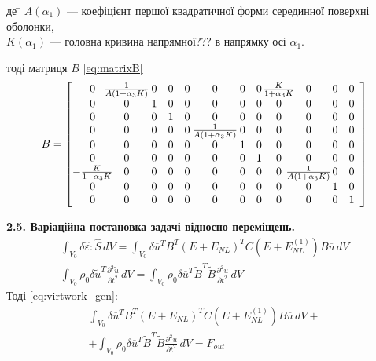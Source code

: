 \documentclass[10pt,a4paper]{article}
\numberwithin{figure}{section}
\numberwithin{equation}{section}
\begin{document}
\begin{tabbing}
де \= $  A \left( \alpha_1 \right)$ --- коефіцієнт першої квадратичної форми серединної поверхні оболонки,\\
\> $K \left( \alpha_1 \right)$ --- головна кривина напрямної??? в напрямку осі $\alpha_1$.
\end{tabbing}
тоді матриця $B$ \eqref{eq:matrixB}
\begin{equation}
\begin{aligned}
B=
\left[\begin{array}{@{}c@{\hspace{-8pt}}c@{\hspace{2pt}}ccc@{\hspace{2pt}}c@{\hspace{2pt}}cc@{\hspace{1pt}}c@{\hspace{-8pt}}c@{\hspace{1pt}}cc}
0 & \frac{1}{A \left(1+ \alpha_{3} K \right)} & 0 & 0 & 0 & 0 & 0 & 0 & \frac{K}{1+ \alpha_{3} K } & 0 & 0 & 0\\0 & 0 & 1 & 0 & 0 & 0 & 0 & 0 & 0 & 0 & 0 & 0\\0 & 0 & 0 & 1 & 0 & 0 & 0 & 0 & 0 & 0 & 0 & 0\\0 & 0 & 0 & 0 & 0 & \frac{1}{A \left(1+ \alpha_{3} K \right)} & 0 & 0 & 0 & 0 & 0 & 0\\0 & 0 & 0 & 0 & 0 & 0 & 1 & 0 & 0 & 0 & 0 & 0\\0 & 0 & 0 & 0 & 0 & 0 & 0 & 1 & 0 & 0 & 0 & 0\\- \frac{K}{1+ \alpha_{3} K } & 0 & 0 & 0 & 0 & 0 & 0 & 0 & 0 & \frac{1}{A \left(1+ \alpha_{3} K \right)} & 0 & 0\\0 & 0 & 0 & 0 & 0 & 0 & 0 & 0 & 0 & 0 & 1 & 0\\0 & 0 & 0 & 0 & 0 & 0 & 0 & 0 & 0 & 0 & 0 & 1\end{array}\right]
\end{aligned}
\end{equation}


\textbf{2.5. Варіаційна постановка задачі відносно переміщень.}
\begin{align}
\int_{V_0} \delta\hat{\varepsilon}:\hat{S}\,dV=\int_{V_0} \delta\overline{u} ^T B ^T\left( E + E_{NL} \right)^T C \left( E + E_{NL}^{(1)} \right)B \overline{u} \, dV\\ \int_{V_0} \rho_0 \delta\tilde{u} ^T \frac{\partial^2 \tilde{u}}{\partial t ^2}\,dV=\int_{V_0} \rho_0 \delta\overline{u} ^T \tilde{B}^T \tilde{B}\frac{\partial^2 \overline{u}}{\partial t ^2}\,dV
\end{align}
Тоді \eqref{eq:virtwork_gen}:
\begin{multline} \label{eq:virtwork_gen_u}
\int_{V_0} \delta\overline{u} ^T B ^T\left( E + E_{NL} \right)^T C \left( E + E_{NL}^{(1)} \right)B \overline{u} \, dV+\\+\int_{V_0} \rho_0 \delta\overline{u} ^T \tilde{B}^T \tilde{B}\frac{\partial^2 \overline{u}}{\partial t ^2}\,dV=F_{out}
\end{multline}
\end{document}
